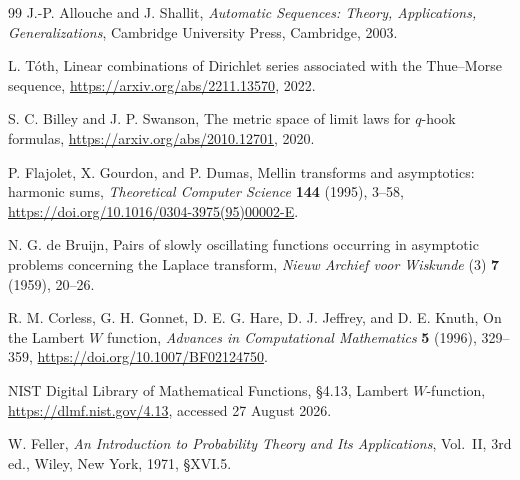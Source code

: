 \documentclass[11pt,oneside]{article}
\theoremstyle{definition}
\theoremstyle{remark}
\begin{document}
\begin{thebibliography}{99}
J.-P. Allouche and J. Shallit,
\emph{Automatic Sequences: Theory, Applications, Generalizations},
Cambridge University Press, Cambridge, 2003.

L. T\'oth,
Linear combinations of Dirichlet series associated with the Thue--Morse sequence,
\url{https://arxiv.org/abs/2211.13570}, 2022.

S. C. Billey and J. P. Swanson,
The metric space of limit laws for $q$-hook formulas,
\url{https://arxiv.org/abs/2010.12701}, 2020.

P. Flajolet, X. Gourdon, and P. Dumas,
Mellin transforms and asymptotics: harmonic sums,
\emph{Theoretical Computer Science} \textbf{144} (1995), 3--58,
\url{https://doi.org/10.1016/0304-3975(95)00002-E}.

N. G. de Bruijn,
Pairs of slowly oscillating functions occurring in asymptotic problems concerning the Laplace transform,
\emph{Nieuw Archief voor Wiskunde} (3) \textbf{7} (1959), 20--26.

R. M. Corless, G. H. Gonnet, D. E. G. Hare, D. J. Jeffrey, and D. E. Knuth,
On the Lambert $W$ function,
\emph{Advances in Computational Mathematics} \textbf{5} (1996), 329--359,
\url{https://doi.org/10.1007/BF02124750}.

NIST Digital Library of Mathematical Functions,
\S4.13, Lambert $W$-function,
\url{https://dlmf.nist.gov/4.13}, accessed 27 August 2026.

W. Feller,
\emph{An Introduction to Probability Theory and Its Applications}, Vol.~II, 3rd ed.,
Wiley, New York, 1971, \S XVI.5.

\end{thebibliography}
\end{document}
